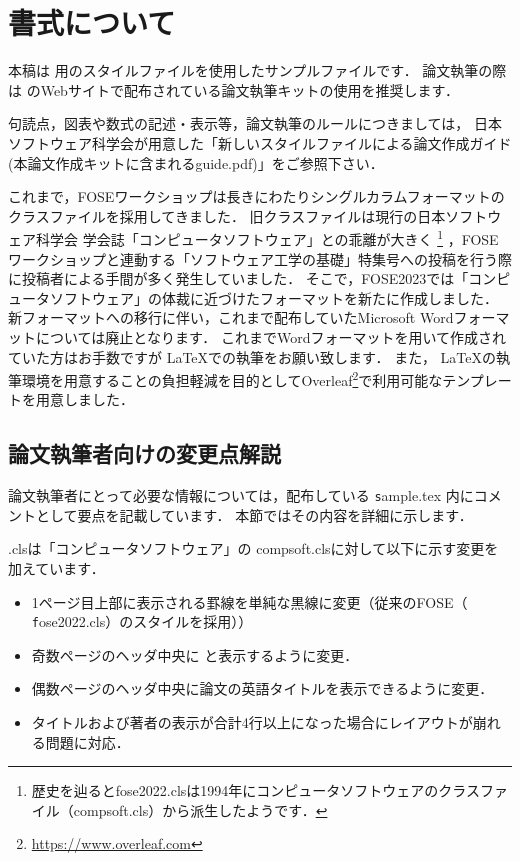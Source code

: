 \documentclass[T,J]{fose} %
\newcommand{\foseclassfile}{\MakeLowercase{\foseabbrev}.cls}
\begin{document}
\section{書式について} \label{sec:PaperStyle}
本稿は \foseabbrev 用のスタイルファイルを使用したサンプルファイルです．
論文執筆の際は \foseabbrev のWebサイトで配布されている論文執筆キットの使用を推奨します．

句読点，図表や数式の記述・表示等，論文執筆のルールにつきましては，
日本ソフトウェア科学会が用意した「新しいスタイルファイルによる論文作成ガイド(本論文作成キットに含まれるguide.pdf)」をご参照下さい．

これまで，FOSEワークショップは長きにわたりシングルカラムフォーマットのクラスファイルを採用してきました．
旧クラスファイルは現行の日本ソフトウェア科学会 学会誌「コンピュータソフトウェア」との乖離が大きく
\footnote{歴史を辿るとfose2022.clsは1994年にコンピュータソフトウェアのクラスファイル（compsoft.cls）から派生したようです．}
，FOSEワークショップと連動する「ソフトウェア工学の基礎」特集号への投稿を行う際に投稿者による手間が多く発生していました．
そこで，FOSE2023では「コンピュータソフトウェア」の体裁に近づけたフォーマットを新たに作成しました．
新フォーマットへの移行に伴い，これまで配布していたMicrosoft Wordフォーマットについては廃止となります．
これまでWordフォーマットを用いて作成されていた方はお手数ですが \LaTeX での執筆をお願い致します．
また， \LaTeX の執筆環境を用意することの負担軽減を目的としてOverleaf\footnote{\url{https://www.overleaf.com}}で利用可能なテンプレートを用意しました．

\subsection{論文執筆者向けの変更点解説}\label{subsec:forauthors}
論文執筆者にとって必要な情報については，配布している {\texttt sample.tex} 内にコメントとして要点を記載しています．
本節ではその内容を詳細に示します．

\foseclassfile は「コンピュータソフトウェア」の compsoft.clsに対して以下に示す変更を加えています．
\begin{itemize}
	\item 1ページ目上部に表示される罫線を単純な黒線に変更（従来のFOSE（ {\texttt fose2022.cls}）のスタイルを採用））
	\item 奇数ページのヘッダ中央に {\textbf \foseabbrev } と表示するように変更．
	\item 偶数ページのヘッダ中央に論文の英語タイトルを表示できるように変更．
	\item タイトルおよび著者の表示が合計4行以上になった場合にレイアウトが崩れる問題に対応．
\end{itemize}
\end{document}
